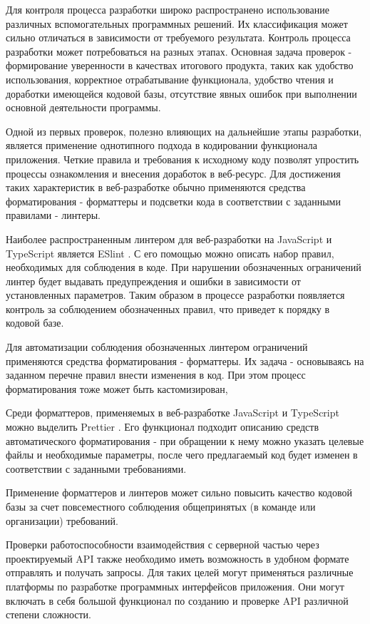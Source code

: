 Для контроля процесса разработки широко распространено использование различных вспомогательных программных решений.
Их классификация может сильно отличаться в зависимости от требуемого результата.
Контроль процесса разработки может потребоваться на разных этапах.
Основная задача проверок - формирование уверенности в качествах итогового продукта, таких как удобство использования, корректное отрабатывание функционала, удобство чтения и доработки имеющейся кодовой базы, отсутствие явных ошибок при выполнении основной деятельности программы.

Одной из первых проверок, полезно влияющих на дальнейшие этапы разработки, является применение однотипного подхода в кодировании функционала приложения.
Четкие правила и требования к исходному коду позволят упростить процессы ознакомления и внесения доработок в веб-ресурс.
Для достижения таких  характеристик в веб-разработке обычно применяются средства форматирования - форматтеры и подсветки кода в соответствии с заданными правилами - линтеры.

Наиболее распространенным линтером для веб-разработки на JavaScript и TypeScript является ESlint \cite{eslint}.
С его помощью можно описать набор правил, необходимых для соблюдения в коде.
При нарушении обозначенных ограничений линтер будет выдавать предупреждения и ошибки в зависимости от установленных параметров.
Таким образом в процессе разработки появляется контроль за соблюдением обозначенных правил, что приведет к порядку в кодовой базе.

Для автоматизации соблюдения обозначенных линтером ограничений применяются средства форматирования - форматтеры.
Их задача - основываясь на заданном перечне правил внести изменения в код.
При этом процесс форматирования тоже может быть кастомизирован,

Среди форматтеров, применяемых в веб-разработке JavaScript и TypeScript можно выделить Prettier \cite{prettier}.
Его функционал подходит описанию средств автоматического форматирования - при обращении к нему можно указать целевые файлы и необходимые параметры, после чего предлагаемый код будет изменен в соответствии с заданными требованиями.

Применение форматтеров и линтеров может сильно повысить качество кодовой базы за счет повсеместного соблюдения общепринятых (в команде или организации) требований.

Проверки работоспособности взаимодействия с серверной частью через проектируемый API также необходимо иметь возможность в удобном формате отправлять и получать запросы.
Для таких целей могут применяться различные платформы по разработке программных интерфейсов приложения.
Они могут включать в себя большой функционал по созданию и проверке API различной степени сложности.

